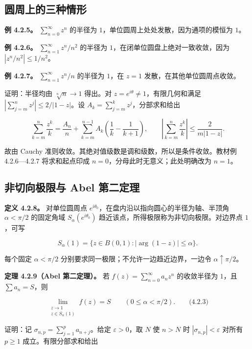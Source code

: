 \documentclass[11pt,a4paper]{article}
\begin{document}
\subsection{圆周上的三种情形}\label{ch04-s2-heading-3}

\textbf{例 4.2.5。} \(\sum_{n=0}^{\infty}z^n\) 的半径为
\(1\)，单位圆周上处处发散，因为通项的模恒为 \(1\)。

\textbf{例 4.2.6。} \(\sum_{n=1}^{\infty}z^n/n^2\) 的半径为
\(1\)，在闭单位圆盘上绝对一致收敛，因为 \(|z^n/n^2|\le1/n^2\)。

\textbf{例 4.2.7。} \(\sum_{n=1}^{\infty}z^n/n\) 的半径为 \(1\)，在
\(z=1\) 发散，在其他单位圆周点收敛。

证明：半径均由 \(\sqrt[n]{n}\to1\) 得出。对
\(z=e^{i\theta}\ne1\)，有限几何和满足
\(|\sum_{j=m}^n z^j|\le2/|1-z|\)。设
\(A_k=\sum_{j=m}^kz^j\)，分部求和给出

\[
\sum_{k=m}^n\frac{z^k}{k}
=\frac{A_n}{n}+\sum_{k=m}^{n-1}A_k\left(\frac1k-\frac1{k+1}\right),
\qquad
\left|\sum_{k=m}^n\frac{z^k}{k}\right|\le\frac{2}{m|1-z|}.
\]

故由 Cauchy 准则收敛。其绝对值级数是调和级数，所以是条件收敛。教材例
4.2.6---4.2.7 将求和起点印成 \(n=0\)，分母此时无意义；此处明确改为
\(n=1\)。

\subsection{非切向极限与 Abel 第二定理}\label{ch04-s2-heading-4}

\textbf{定义 4.2.8。} 对单位圆周点
\(e^{i\theta_0}\)，在盘内沿以指向圆心的半径为轴、半顶角 \(\alpha<\pi/2\)
的固定角域 \(S_\alpha(e^{i\theta_0})\)
趋近该点，所得极限称为非切向极限。对边界点 \(1\)，可写

\[
S_\alpha(1)=\{z\in B(0,1):|\arg(1-z)|\le\alpha\}.
\]

每个固定 \(\alpha<\pi/2\) 分别要求同一极限；不允许一边趋近边界，一边令
\(\alpha\uparrow\pi/2\)。

\textbf{定理 4.2.9（Abel 第二定理）。} 若
\(f(z)=\sum_{n=0}^{\infty}a_nz^n\) 的收敛半径为 \(1\)，且
\(\sum a_n=S\)，则

\[
\lim_{\substack{z\to1\\z\in S_\alpha(1)}}f(z)=S
\qquad(0\le\alpha<\pi/2).
\qquad\text{(4.2.3)}
\]

证明：记 \(\sigma_{n,p}=\sum_{j=1}^p a_{n+j}\)。给定
\(\varepsilon>0\)，取 \(N\) 使 \(n>N\) 时 \(|\sigma_{n,p}|<\varepsilon\)
对所有 \(p\ge1\) 成立。有限分部求和给出
\end{document}
